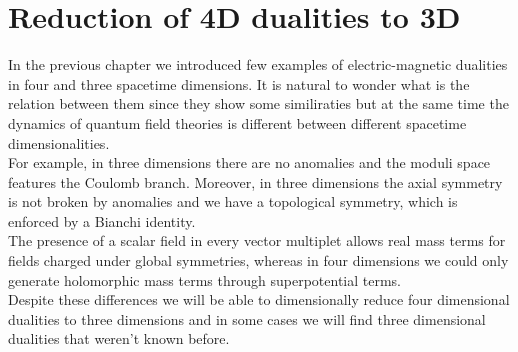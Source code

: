 
\chapter{Reduction of 4D dualities to 3D}

% 


In the previous chapter we introduced few examples of electric-magnetic dualities in four and three spacetime dimensions.
It is natural to wonder what is the relation between them since they show some similiraties but at the same time the dynamics of quantum field theories is different between different spacetime dimensionalities.\\
For example, in three dimensions there are no anomalies and the moduli space features the Coulomb branch. 
Moreover, in three dimensions the axial symmetry is not broken by anomalies and we have a topological symmetry, which is enforced by a Bianchi identity.\\
The presence of a scalar field in every vector multiplet allows real mass terms for fields charged under global symmetries, whereas in four dimensions we could only generate holomorphic mass terms through superpotential terms.\\
Despite these differences we will be able to dimensionally reduce four dimensional dualities to three dimensions and in some cases we will find three dimensional dualities that weren't known before.\\

